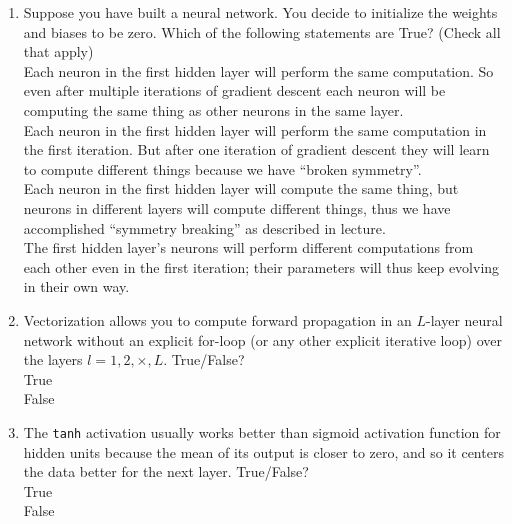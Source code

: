 \begin{enumerate}
        \item Suppose you have built a neural network. You decide to initialize the weights and biases to be zero. Which of the following statements are True? (Check all that apply)\\
        \hspace{1cm}\checkedchoice{} Each neuron in the first hidden layer will perform the same computation. So even after multiple iterations of gradient descent each neuron will be computing the same thing as other neurons in the same layer.\\
        \hspace{1cm}\choice{} Each neuron in the first hidden layer will perform the same computation in the first iteration. But after one iteration of gradient descent they will learn to compute different things because we have ``broken symmetry''. \\ 
        \hspace{1cm}\choice{} Each neuron in the first hidden layer will compute the same thing, but neurons in different layers will compute different things, thus we have accomplished ``symmetry breaking'' as described in lecture. \\ 
        \hspace{1cm}\choice{} The first hidden layer's neurons will perform different computations from each other even in the first iteration; their parameters will thus keep evolving in their own way.\\
        \solution{}
    \item Vectorization allows you to compute forward propagation in an $L$-layer neural network without an explicit for-loop (or any other explicit iterative loop) over the layers $l=1, 2, \times, L$. True/False? \\ 
        \hspace{1cm}\checkedchoice{} True \\ 
        \hspace{1cm}\choice{} False\\
        \solution{}
    \item  The {\tt tanh} activation usually works better than sigmoid activation function for hidden units because the mean of its output is closer to zero, and so it centers the data better for the next layer.  True/False? \\ 
        \hspace{1cm}\checkedchoice{} True \\ 
        \hspace{1cm}\choice{} False \\ 
        \solution{}


\end{enumerate}
